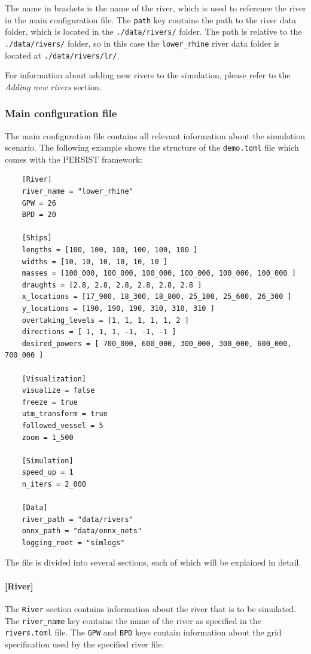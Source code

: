 \documentclass[
	a4paper, %
	12pt, %
]{persist}
\begin{document}
The name in brackets is the name of the river, which is used to reference the river in the main configuration file. The \verb|path| key contains the path to the river data folder, which is located in the \verb|./data/rivers/| folder. The path is relative to the \verb|./data/rivers/| folder, so in this case the \verb|lower_rhine| river data folder is located at \verb|./data/rivers/lr/|.

For information about adding new rivers to the simulation, please refer to the \emph{Adding new rivers} section.

\subsubsection{Main configuration file}

The main configuration file contains all relevant information about the simulation scenario. The following example shows the structure of the \verb|demo.toml| file which comes with the PERSIST framework:

\begin{lstlisting}
	[River]
	river_name = "lower_rhine"
	GPW = 26
	BPD = 20

	[Ships]
	lengths = [100, 100, 100, 100, 100, 100 ]
	widths = [10, 10, 10, 10, 10, 10 ]
	masses = [100_000, 100_000, 100_000, 100_000, 100_000, 100_000 ]
	draughts = [2.8, 2.8, 2.8, 2.8, 2.8, 2.8 ]
	x_locations = [17_900, 18_300, 18_800, 25_100, 25_600, 26_300 ]
	y_locations = [190, 190, 190, 310, 310, 310 ]
	overtaking_levels = [1, 1, 1, 1, 1, 2 ]
	directions = [ 1, 1, 1, -1, -1, -1 ]
	desired_powers = [ 700_000, 600_000, 300_000, 300_000, 600_000, 700_000 ]

	[Visualization]
	visualize = false
	freeze = true
	utm_transform = true
	followed_vessel = 5
	zoom = 1_500

	[Simulation]
	speed_up = 1
	n_iters = 2_000

	[Data]
	river_path = "data/rivers"
	onnx_path = "data/onnx_nets"
	logging_root = "simlogs"
\end{lstlisting}

The file is divided into several sections, each of which will be explained in detail. 

\paragraph{[River]}

The \verb|River| section contains information about the river that is to be simulated. The \verb|river_name| key contains the name of the river as specified in the \verb|rivers.toml| file. The \verb|GPW| and \verb|BPD| keys contain information about the grid specification used by the specified river file. 
\end{document}
